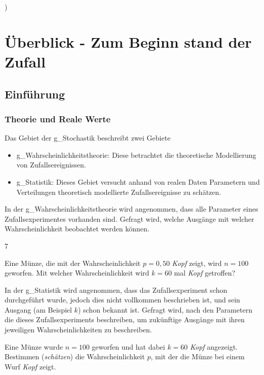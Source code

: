 )\section{Überblick - Zum Beginn stand der Zufall}
\subsection{Einführung}
\subsubsection{Theorie und Reale Werte} 
Das Gebiet der \gls{g_Stochastik} beschreibt zwei Gebiete
\begin{itemize}
	\item \gls{g_Wahrscheinlichkeitstheorie}: Diese betrachtet die theoretische Modellierung von Zufallsereignissen.
	\item \gls{g_Statistik}: Dieses Gebiet versucht anhand von realen Daten Parametern und Verteilungen theoretisch modellierte Zufallsereignisse zu schätzen.
\end{itemize}


In der \gls{g_Wahrscheinlichkeitstheorie} wird angenommen, dass alle Parameter eines Zufallsexperimentes vorhanden sind. Gefragt wird, welche Ausgänge mit welcher Wahrscheinlichkeit beobachtet werden können.

\begin{center}7
	\begin{minipage}{0.75\linewidth}
		Eine Münze, die mit der Wahrscheinlichkeit $p = 0,50$ \textit{Kopf} zeigt, wird $n = 100$ geworfen. Mit welcher Wahrscheinlichkeit wird $k=60$ mal \textit{Kopf} getroffen? 
	\end{minipage}
\end{center}

\noindent In der \gls{g_Statistik} wird angenommen, dass das Zufallsexperiment schon durchgeführt wurde, jedoch dies nicht vollkommen beschrieben ist, und sein Ausgang (am Beispiel $k$) schon bekannt ist.
Gefragt wird, nach den Parametern die dieses Zufallsexperiments beschreiben, um zukünftige Ausgänge mit ihren jeweiligen Wahrscheinlichkeiten zu beschreiben.\\

\begin{center}
	\begin{minipage}{0.75\linewidth}
		Eine Münze wurde $n=100$ geworfen und hat dabei $k=60$ \textit{Kopf} angezeigt. Bestimmen (\textit{schätzen}) die Wahrscheinlichkeit $p$, mit der die Münze bei einem Wurf \textit{Kopf} zeigt.
	\end{minipage}
\end{center}

